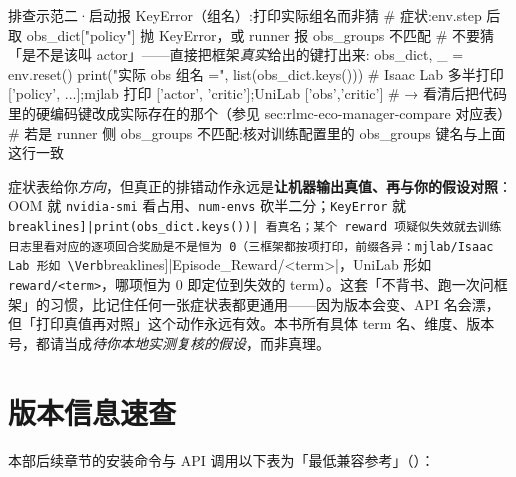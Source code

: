 \begin{codebox}[Python]{排查示范二·启动报 KeyError（组名）:打印实际组名而非猜}
# 症状:env.step 后取 obs_dict["policy"] 抛 KeyError，或 runner 报 obs_groups 不匹配
# 不要猜「是不是该叫 actor」——直接把框架\emph{真实}给出的键打出来:
obs_dict, _ = env.reset()
print("实际 obs 组名 =", list(obs_dict.keys()))
#  Isaac Lab 多半打印 ['policy', ...];mjlab 打印 ['actor', 'critic'];UniLab ['obs','critic']
#  → 看清后把代码里的硬编码键改成实际存在的那个（参见 sec:rlmc-eco-manager-compare 对应表）
#  若是 runner 侧 obs_groups 不匹配:核对训练配置里的 obs_groups 键名与上面这行一致
\end{codebox}

\begin{insight}\label{ins:rlmc-eco-debugmethod}
症状表给你\emph{方向}，但真正的排错动作永远是\textbf{让机器输出真值、再与你的假设对照}：OOM 就 \verb|nvidia-smi| 看占用、\verb|num-envs| 砍半二分；\verb|KeyError| 就 \Verb[breaklines]|print(obs_dict.keys())| 看真名；某个 reward 项疑似失效就去训练日志里看对应的逐项回合奖励是不是恒为 0（三框架都按项打印，前缀各异：mjlab/Isaac Lab 形如 \Verb[breaklines]|Episode_Reward/<term>|，UniLab 形如 \verb|reward/<term>|，哪项恒为 0 即定位到失效的 term）。这套「不背书、跑一次问框架」的习惯，比记住任何一张症状表都更通用——因为版本会变、API 名会漂，但「打印真值再对照」这个动作永远有效。本书所有具体 term 名、维度、版本号，都请当成\emph{待你本地实测复核的假设}，而非真理。
\end{insight}

\section*{版本信息速查}
\label{sec:rlmc-eco-version}

本部后续章节的安装命令与 API 调用以下表为「最低兼容参考」（）：

